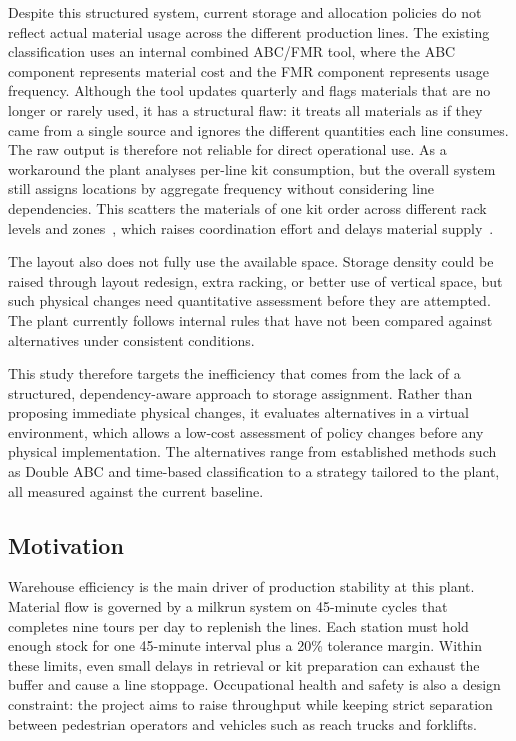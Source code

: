 \documentclass[conference]{IEEEtran}
\begin{document}
Despite this structured system, current storage and allocation policies do
not reflect actual material usage across the different production lines. The
existing classification uses an internal combined ABC/FMR tool, where the ABC
component represents material cost and the FMR component represents usage
frequency. Although the tool updates quarterly and flags materials that are
no longer or rarely used, it has a structural flaw: it treats all materials
as if they came from a single source and ignores the different quantities
each line consumes. The raw output is therefore not reliable for direct
operational use. As a workaround the plant analyses per-line kit consumption,
but the overall system still assigns locations by aggregate frequency without
considering line dependencies. This scatters the materials of one kit order
across different rack levels and zones~\cite{emde2012,limere2012}, which
raises coordination effort and delays material supply~\cite{limere2012}.

The layout also does not fully use the available space. Storage density could
be raised through layout redesign, extra racking, or better use of vertical
space, but such physical changes need quantitative assessment before they are
attempted. The plant currently follows internal rules that have not been
compared against alternatives under consistent conditions.

This study therefore targets the inefficiency that comes from the lack of a
structured, dependency-aware approach to storage assignment. Rather than
proposing immediate physical changes, it evaluates alternatives in a virtual
environment, which allows a low-cost assessment of policy changes before any
physical implementation. The alternatives range from established methods such
as Double ABC and time-based classification to a strategy tailored to the
plant, all measured against the current baseline.

\subsection{Motivation}
Warehouse efficiency is the main driver of production stability at this
plant. Material flow is governed by a milkrun system on 45-minute cycles that
completes nine tours per day to replenish the lines. Each station must hold
enough stock for one 45-minute interval plus a 20\% tolerance margin. Within
these limits, even small delays in retrieval or kit preparation can exhaust
the buffer and cause a line stoppage. Occupational health and safety is also
a design constraint: the project aims to raise throughput while keeping strict
separation between pedestrian operators and vehicles such as reach trucks and
forklifts.
\end{document}
